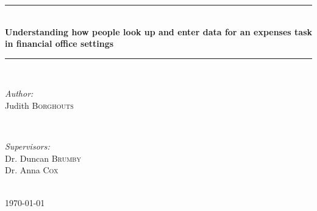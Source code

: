 \begin{titlepage}

\newcommand{\HRule}{\rule{\linewidth}{0.5mm}} %

\center %



\HRule \\[0.4cm]
{\Large \bfseries Understanding how people look up and enter data for an expenses task in financial office settings
}\\[0.4cm] %
\HRule \\[1.5cm]
 

\begin{minipage}{0.4\textwidth}
\begin{flushleft} \large
\emph{Author:}\\
Judith \textsc{Borghouts} %
\end{flushleft}
\end{minipage}
~
\begin{minipage}{0.4\textwidth}
\begin{flushright} \large
\emph{Supervisors:} \\
Dr. Duncan \textsc{Brumby} \\%
Dr. Anna \textsc{Cox}
\end{flushright}
\end{minipage}\\[4cm]



{\large \today}\\[3cm] %


\end{titlepage}
